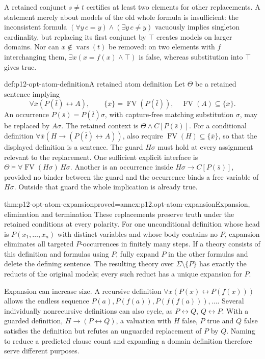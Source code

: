 A retained conjunct \(s\ne t\) certifies at least two elements for
other replacements. A statement merely about models of the old
whole formula is insufficient: the inconsistent formula
\((\forall y\,c=y)\land(\exists y\,c\ne y)\) vacuously implies
singleton cardinality, but replacing its first conjunct by \(\top\)
creates models on larger domains.
Nor can \(x\notin\operatorname{vars}(t)\) be removed: on two elements
with \(f\) interchanging them, \(\exists x(x=f(x)\land\top)\)
is false, whereas substitution into \(\top\) gives true.

\begin{hbdefinition}{def:p12-opt-atom-definition}{A retained atom definition}
Let \(\Theta\) be a retained sentence implying
\[
 \forall\bar x(P(\bar t)\leftrightarrow A),
 \qquad \{\bar x\}=\operatorname{FV}(P(\bar t)),\quad
 \operatorname{FV}(A)\subseteq\{\bar x\}.
\]
An occurrence \(P(\bar s)=P(\bar t)\sigma\), with capture-free
matching substitution \(\sigma\), may be replaced by \(A\sigma\).
The retained context is \(\Theta\land C[P(\bar s)]\).
For a conditional definition
\(\forall\bar x(H\to(P(\bar t)\leftrightarrow A))\),
also require \(\operatorname{FV}(H)\subseteq\{\bar x\}\), so that
the displayed definition is a sentence.
The guard \(H\sigma\) must hold at every assignment relevant to the
replacement. One sufficient explicit interface is
\(\Theta\models\forall\operatorname{FV}(H\sigma)\,H\sigma\).
Another is an occurrence inside \(H\sigma\to C[P(\bar s)]\),
provided no binder between the guard and the occurrence binds
a free variable of \(H\sigma\). Outside that guard the whole
implication is already true.
\end{hbdefinition}

\begin{hbtheorem}{thm:p12-opt-atom-expansion}{proved=annex:p12.opt-atom-expansion}{Expansion, elimination and termination}
These replacements preserve truth under the retained conditions at
every polarity. For one unconditional definition whose head is
\(P(x_1,\ldots,x_n)\) with distinct variables and whose body contains
no \(P\), expansion eliminates all targeted \(P\)-occurrences in
finitely many steps.
If a theory consists of this definition and formulas using \(P\),
fully expand \(P\) in the other formulas and delete the defining
sentence. The resulting theory over \(\Sigma\setminus\{P\}\)
has exactly the reducts of the original models; every such reduct
has a unique expansion for \(P\).
\end{hbtheorem}

Expansion can increase size. A recursive definition
\(\forall x(P(x)\leftrightarrow P(f(x)))\) allows the endless
sequence \(P(a),P(f(a)),P(f(f(a))),\ldots\).
Several individually nonrecursive definitions can also cycle,
as \(P\leftrightarrow Q\), \(Q\leftrightarrow P\).
With a guarded definition, \(H\to(P\leftrightarrow Q)\),
a valuation with \(H\) false, \(P\) true and \(Q\) false satisfies
the definition but refutes an unguarded replacement of \(P\) by \(Q\).
Naming to reduce a predicted clause count and expanding a domain
definition therefore serve different purposes.

